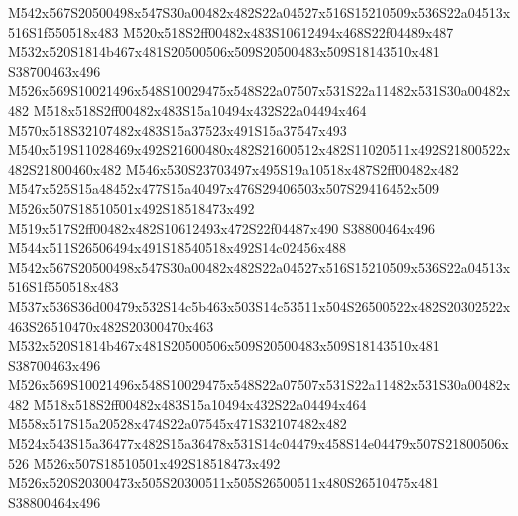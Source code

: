 \documentclass{article}
\begin{document}
\begin{multicols}{2}





M542x567S20500498x547S30a00482x482S22a04527x516S15210509x536S22a04513x516S1f550518x483 M520x518S2ff00482x483S10612494x468S22f04489x487 M532x520S1814b467x481S20500506x509S20500483x509S18143510x481 S38700463x496 M526x569S10021496x548S10029475x548S22a07507x531S22a11482x531S30a00482x482 M518x518S2ff00482x483S15a10494x432S22a04494x464 M570x518S32107482x483S15a37523x491S15a37547x493 M540x519S11028469x492S21600480x482S21600512x482S11020511x492S21800522x482S21800460x482 M546x530S23703497x495S19a10518x487S2ff00482x482 M547x525S15a48452x477S15a40497x476S29406503x507S29416452x509 M526x507S18510501x492S18518473x492 M519x517S2ff00482x482S10612493x472S22f04487x490 S38800464x496 M544x511S26506494x491S18540518x492S14c02456x488 M542x567S20500498x547S30a00482x482S22a04527x516S15210509x536S22a04513x516S1f550518x483 M537x536S36d00479x532S14c5b463x503S14c53511x504S26500522x482S20302522x463S26510470x482S20300470x463 M532x520S1814b467x481S20500506x509S20500483x509S18143510x481 S38700463x496 M526x569S10021496x548S10029475x548S22a07507x531S22a11482x531S30a00482x482 M518x518S2ff00482x483S15a10494x432S22a04494x464 M558x517S15a20528x474S22a07545x471S32107482x482 M524x543S15a36477x482S15a36478x531S14c04479x458S14e04479x507S21800506x526 M526x507S18510501x492S18518473x492 M526x520S20300473x505S20300511x505S26500511x480S26510475x481 S38800464x496




\end{multicols}
\end{document}
